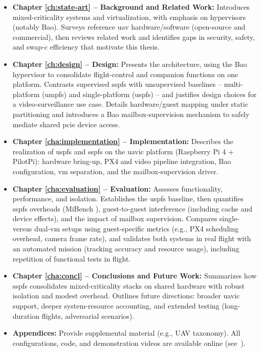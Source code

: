 \begin{itemize}
\item
\textbf{Chapter \ref{ch:state-art} -- Background and Related Work:}
Introduces mixed-criticality systems and virtualization, with emphasis on
hypervisors (notably Bao). Surveys reference \gls{uav} hardware/software
(open-source and commercial), then reviews related work and identifies gaps in
security, safety, and \gls{swap-c} efficiency that motivate this thesis.

\item
\textbf{Chapter \ref{ch:design} -- Design:}
Presents the  architecture, using the Bao hypervisor to
consolidate flight-control and companion functions on one platform. Contrasts
supervised \gls{sspfs} with unsupervised baselines -- multi-platform
(\gls{umpfs}) and single-platform (\gls{uspfs}) -- and justifies design choices
for a video-surveillance use case. Details hardware/guest mapping under static
partitioning and introduces a Bao mailbox-supervision mechanism to safely
mediate shared \gls{pcie} device access.

\item
\textbf{Chapter \ref{cha:implementation} -- Implementation:}
Describes the realization of \gls{uspfs} and \gls{sspfs} on the \gls{uavic}
platform (Raspberry Pi 4 + PilotPi): hardware bring-up, PX4 and video pipeline
integration, Bao configuration, \gls{vm} separation, and the mailbox-supervision
driver.

\item
\textbf{Chapter \ref{cha:evaluation} -- Evaluation:}
Assesses functionality, performance, and isolation. Establishes the \gls{uspfs}
baseline, then quantifies \gls{sspfs} overheads (MiBench ),
guest-to-guest interference (including cache and device effects), and the impact
of mailbox supervision. Compares single- versus dual-\gls{vm} setups using
guest-specific metrics (e.g., PX4 scheduling overhead, camera frame rate), and
validates both systems in real flight with an automated mission (tracking
accuracy and resource usage), including repetition of functional tests in
flight.

\item
\textbf{Chapter \ref{cha:concl} -- Conclusions and Future Work:}
Summarizes how \gls{sspfs} consolidates mixed-criticality stacks on shared
hardware with robust isolation and modest overhead. Outlines future directions:
broader \gls{uavic} support, deeper system-resource accounting, and extended
testing (long-duration flights, adversarial scenarios).

\item
\textbf{Appendices:}
Provide supplemental material (e.g., UAV taxonomy). All configurations, code,
and demonstration videos are available online (see~\cite{thesis-sw-github}).
\end{itemize}



